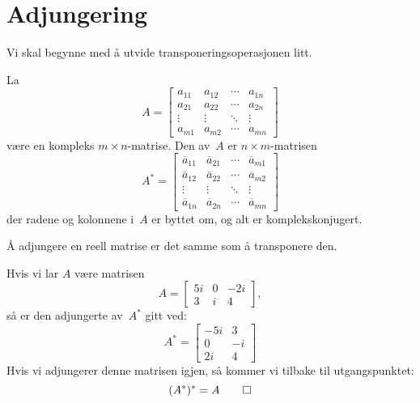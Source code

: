 

\label{ch:projeksjon}

\section*{Adjungering}

Vi skal begynne med å utvide transponeringsoperasjonen litt. 

\begin{defn}
La
\[
A =
\begin{bmatrix}
a_{11} & a_{12} & \cdots & a_{1n} \\
a_{21} & a_{22} & \cdots & a_{2n} \\
\vdots & \vdots & \ddots & \vdots \\
a_{m1} & a_{m2} & \cdots & a_{mn}
\end{bmatrix}
\]
være en kompleks $m \times n$-matrise.  Den  av~$A$ er
$n \times m$-matrisen
\[
A^* =
\begin{bmatrix}
\overline a_{11} & \overline a_{21} & \cdots & \overline a_{m1} \\
\overline a_{12} & \overline a_{22} & \cdots & \overline a_{m2} \\
\vdots & \vdots & \ddots & \vdots \\
\overline a_{1n} & \overline a_{2n} & \cdots & \overline a_{mn}
\end{bmatrix}
\]
der radene og kolonnene i~$A$ er byttet om, og alt er komplekskonjugert.
\end{defn}

\begin{merkx}
Å adjungere en reell matrise er det samme som å transponere den.
\end{merkx}

\begin{ex}
Hvis vi lar $A$ være matrisen
\[
A =
\begin{bmatrix}
5i & 0 & -2i \\
3 & i &  4
\end{bmatrix},
\]
så er den adjungerte av~$A^*$ gitt ved:
\[
A^* =
\begin{bmatrix}
 -5i & 3 \\
 0 & -i \\
2i & 4
\end{bmatrix}
\]
Hvis vi adjungerer denne matrisen igjen, så kommer vi tilbake til
utgangspunktet:
\[
(A^*)^* = A\qedhere
\]
\end{ex}

